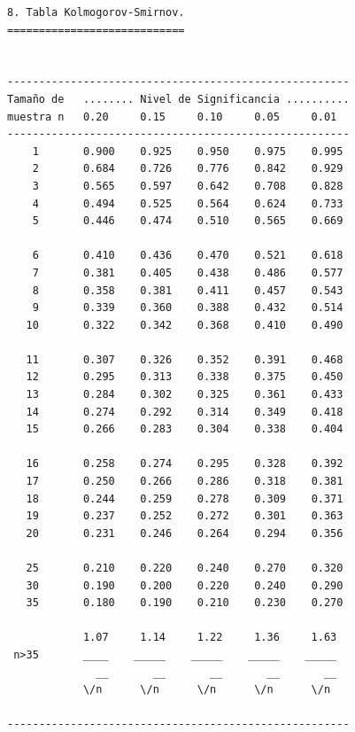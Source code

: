 \begin{verbatim}
8. Tabla Kolmogorov-Smirnov.
============================


------------------------------------------------------
Tamaño de   ........ Nivel de Significancia ..........
muestra n   0.20     0.15     0.10     0.05     0.01
------------------------------------------------------
    1       0.900    0.925    0.950    0.975    0.995
    2       0.684    0.726    0.776    0.842    0.929
    3       0.565    0.597    0.642    0.708    0.828
    4       0.494    0.525    0.564    0.624    0.733
    5       0.446    0.474    0.510    0.565    0.669

    6       0.410    0.436    0.470    0.521    0.618
    7       0.381    0.405    0.438    0.486    0.577
    8       0.358    0.381    0.411    0.457    0.543
    9       0.339    0.360    0.388    0.432    0.514
   10       0.322    0.342    0.368    0.410    0.490

   11       0.307    0.326    0.352    0.391    0.468
   12       0.295    0.313    0.338    0.375    0.450
   13       0.284    0.302    0.325    0.361    0.433
   14       0.274    0.292    0.314    0.349    0.418
   15       0.266    0.283    0.304    0.338    0.404

   16       0.258    0.274    0.295    0.328    0.392
   17       0.250    0.266    0.286    0.318    0.381
   18       0.244    0.259    0.278    0.309    0.371
   19       0.237    0.252    0.272    0.301    0.363
   20       0.231    0.246    0.264    0.294    0.356

   25       0.210    0.220    0.240    0.270    0.320
   30       0.190    0.200    0.220    0.240    0.290
   35       0.180    0.190    0.210    0.230    0.270

            1.07     1.14     1.22     1.36     1.63
 n>35       ____    _____    _____    _____    _____
              __       __       __       __       __
            \/n      \/n      \/n      \/n      \/n  

------------------------------------------------------




\end{verbatim}